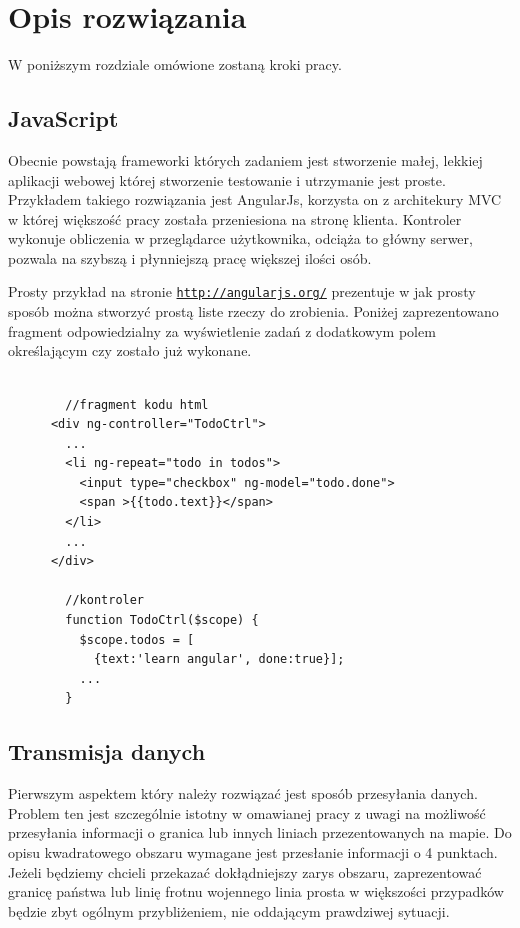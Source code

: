 \chapter{Opis rozwiązania}
\label{cha:Opis rozwiązania}

W poniższym rozdziale omówione zostaną kroki pracy.

\section{JavaScript}
\label{sec:javascript}



Obecnie powstają frameworki których zadaniem jest stworzenie małej, lekkiej aplikacji webowej której stworzenie testowanie i utrzymanie jest proste.\cite{AngularJS} Przykładem takiego rozwiązania jest AngularJs, korzysta on z architekury MVC w której większość pracy została przeniesiona na stronę klienta. Kontroler wykonuje obliczenia w przeglądarce użytkownika, odciąża to główny serwer, pozwala na szybszą i płynniejszą pracę większej ilości osób.

Prosty przykład na stronie \underline{\texttt{http://angularjs.org/}} prezentuje w jak prosty sposób można stworzyć prostą liste rzeczy do zrobienia. Poniżej zaprezentowano fragment odpowiedzialny za wyświetlenie zadań z dodatkowym polem określającym czy zostało już wykonane.

\lstset{language=JavaScript}
\begin{lstlisting}[caption=AngularJs]

        //fragment kodu html
      <div ng-controller="TodoCtrl">
        ...
        <li ng-repeat="todo in todos">
          <input type="checkbox" ng-model="todo.done">
          <span >{{todo.text}}</span>
        </li>
        ...
      </div>

        //kontroler
        function TodoCtrl($scope) {
          $scope.todos = [
            {text:'learn angular', done:true}];
          ...
        }
\end{lstlisting}

\section{Transmisja danych}
\label{sec:transmisjaDanych}

Pierwszym aspektem który należy rozwiązać jest sposób przesyłania danych. Problem ten jest szczególnie istotny w omawianej pracy z uwagi na możliwość przesyłania informacji o granica lub innych liniach przezentowanych na mapie. Do opisu kwadratowego obszaru wymagane jest przesłanie informacji o 4 punktach. Jeżeli będziemy chcieli przekazać dokłądniejszy zarys obszaru, zaprezentować granicę państwa lub linię frotnu wojennego linia prosta w większości przypadków będzie zbyt ogólnym przybliżeniem, nie oddającym prawdziwej sytuacji.

